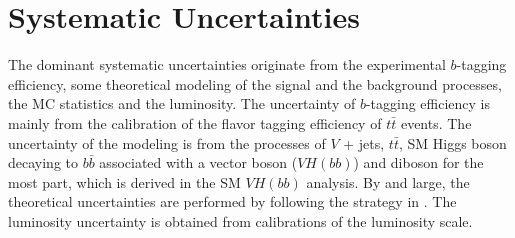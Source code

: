 \documentclass[class=NTHU_thesis, crop=false]{standalone}
\begin{document}
\chapter{Systematic Uncertainties}
\label{chap:systematic_uncertainties}
The dominant systematic uncertainties originate from the experimental $b$-tagging efficiency, some theoretical modeling of the signal and the background processes, the MC statistics and the luminosity. The uncertainty of $b$-tagging efficiency is mainly from the calibration of the flavor tagging efficiency of $t\bar{t}$ events\cite{ATL-PHYS-PUB-2017-013}\cite{1512.01094}. The uncertainty of the modeling is from the processes of $V$ + jets, $t\bar{t}$, SM Higgs boson decaying to $b\bar{b}$ associated with a vector boson ($VH(bb)$) and diboson for the most part, which is derived in the SM $VH(bb)$ analysis\cite{Pandini:2111370}\cite{Robson:2235887}. By and large, the theoretical uncertainties are performed by following the strategy in \cite{ATLAS-CONF-2018-036}. The luminosity uncertainty is obtained from calibrations of the luminosity scale\cite{Aaboud2016}.
\end{document}
